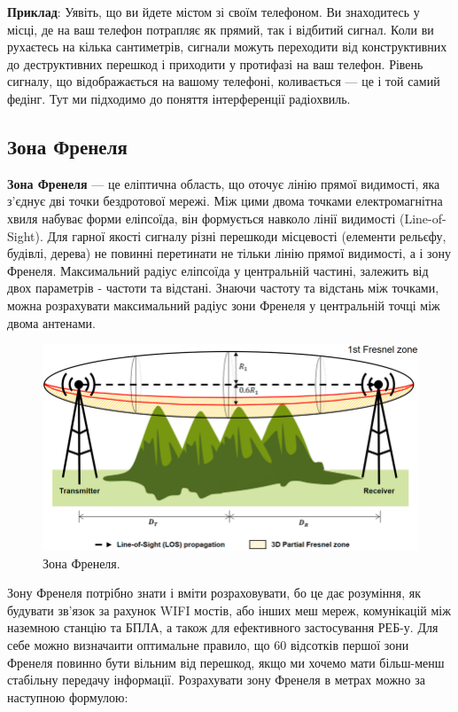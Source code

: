 \documentclass{article}
\begin{document}
\textbf{Приклад}: Уявіть, що ви йдете містом зі своїм телефоном. Ви знаходитесь у місці, де на ваш телефон потрапляє як прямий, так і відбитий сигнал. Коли ви рухаєтесь на кілька сантиметрів, сигнали можуть переходити від конструктивних до деструктивних перешкод і приходити у протифазі на ваш телефон. Рівень сигналу, що відображається на вашому телефоні, коливається — це і той самий федінг. Тут ми підходимо до поняття інтерференції радіохвиль.

\subsection{Зона Френеля}

\textbf{Зона Френеля} --- це еліптична область, що оточує лінію прямої видимості, яка з'єднує дві точки бездротової мережі. Між цими двома точками електромагнітна хвиля набуває форми еліпсоїда, він формується навколо лінії видимості (Line-of-Sight). Для гарної якості сигналу різні перешкоди місцевості (елементи рельєфу, будівлі, дерева) не повинні перетинати не тільки лінію прямої видимості, а і зону Френеля.  Максимальний радіус еліпсоїда у центральній частині, залежить від двох параметрів - частоти та відстані. Знаючи частоту та відстань між точками, можна розрахувати максимальний радіус зони Френеля у центральній точці між двома антенами.

\begin{figure}[h!]
	\centering
	\includegraphics[width=0.9\linewidth]{images/fresnel-zone.png}
	\caption{\label{fig:fresnel-zone} Зона Френеля.}
\end{figure}

Зону Френеля потрібно знати і вміти розраховувати, бо це дає розуміння, як будувати зв'язок за рахунок WIFI мостів, або інших меш мереж, комунікацій між наземною станцію та БПЛА, а також для ефективного застосування РЕБ-у. Для себе можно визначаити оптимальне правило, що 60 відсотків першої зони Френеля повинно бути вільним від перешкод, якщо ми хочемо мати більш-менш стабільну передачу інформації. Розрахувати зону Френеля в метрах можно за наступною формулою:
\end{document}
